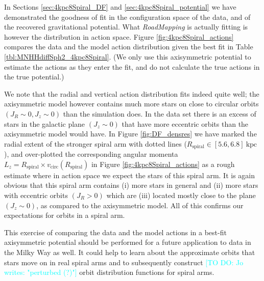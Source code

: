 \documentclass[iop,revtex4,numberedappendix,appendixfloats]{emulateapj}
\newcommand{\RM}{{\sl RoadMapping}}
\newcommand{\Jo}[1]{\textcolor{Cyan}{#1}}
\begin{document}
In Sections \ref{sec:4kpc8Spiral_DF} and \ref{sec:4kpc8Spiral_potential} we have demonstrated the goodness of fit in the configuration space of the data, and of the recovered gravitational potential. What \RM{} is actually fitting is however the distribution in action space. Figure \ref{fig:4kpc8Spiral_actions} compares the data and the model action distribution given the best fit  in Table \ref{tbl:MNHHdiffSph2_4kpc8Spiral}. (We only use this axisymmetric potential to estimate the actions as they enter the fit, and do not calculate the true actions in the true potential.)

We note that the radial and vertical action distribution fits indeed quite well; the axisymmetric model however contains much more stars on close to circular orbits $(J_R \sim 0,J_z \sim 0)$ than the simulation does. In the data set there is an excess of stars in the galactic plane $(J_z\sim0)$ that have more eccentric orbits  than the axisymmetric model would have. In Figure \ref{fig:DF_densres} we have marked the radial extent of the stronger spiral arm with dotted lines ($R_\text{spiral} \in [5.6,6.8]~\text{kpc}$), and over-plotted the corresponding angular momenta $L_z = R_\text{spiral} \times v_\text{circ}(R_\text{spiral})$ in Figure \ref{fig:4kpc8Spiral_actions} as a rough estimate where in action space we expect the stars of this spiral arm. It is again obvious that this spiral arm contains (i) more stars in general and (ii) more stars with eccentric orbits  $(J_R>0)$ which are (iii) located mostly close to the plane $(J_z\sim0)$, as compared to the axisymmetric model. All of this confirms our expectations for orbits in a spiral arm. 

This exercise of comparing the data and the model actions in a best-fit axisymmetric potential should be performed for a future application to data in the Milky Way as well. It could help to learn about the approximate orbits that stars move on in real spiral arms and to subsequently construct \Jo{[TO DO: Jo writes: "perturbed (?)"]} orbit distribution functions for spiral arms.
\end{document}
